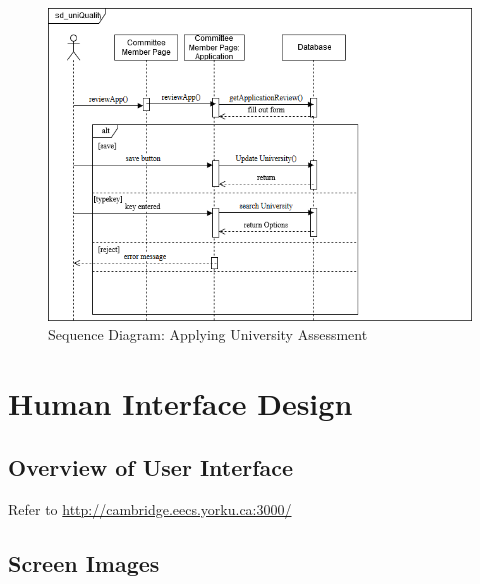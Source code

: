 \documentclass[fontsize=12pt,paper=letter,twoside]{scrartcl}
\begin{document}
\begin{figure}[!htb]
\begin{center}
\includegraphics[width=.99\textwidth]{images/sd_uniQuality.png}
\end{center}
\caption{Sequence Diagram: Applying University Assessment}
\label{fig:sd_apply_uni}
\end{figure}



\clearpage
\newpage
\section{Human Interface Design}

\subsection{Overview of User Interface}

Refer to \url{http://cambridge.eecs.yorku.ca:3000/}

\subsection{Screen Images}
\end{document}
